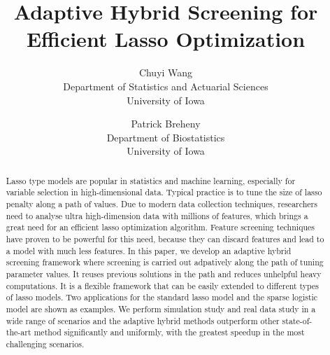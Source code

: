 \documentclass{article}
\title{Adaptive Hybrid Screening for Efficient Lasso Optimization}
\author{Chuyi Wang\\Department of Statistics and Actuarial Sciences\\University of Iowa
  \and
  Patrick Breheny\\Department of Biostatistics\\University of Iowa}
\date{}
\begin{document}
\maketitle

\begin{abstract}
Lasso type models are popular in statistics and machine learning, especially for variable selection in high-dimensional data. Typical practice is to tune the size of lasso penalty along a path of values. Due to modern data collection techniques, researchers need to analyse ultra high-dimension data with millions of features, which brings a great need for an efficient lasso optimization algorithm. Feature screening techniques have proven to be powerful for this need, because they can discard features and lead to a model with much less features. In this paper, we develop an adaptive hybrid screening framework where screening is carried out adpatively along the path of tuning parameter values. It reuses previous solutions in the path and reduces unhelpful heavy computations. It is a flexible framework that can be easily extended to different types of lasso models. Two applications for the standard lasso model and the sparse logistic model are shown as examples. We perform simulation study and real data study in a wide range of scenarios and the adaptive hybrid methods outperform other state-of-the-art method significantly and uniformly, with the greatest speedup in the most challenging scenarios.
\end{abstract}




\end{document}
